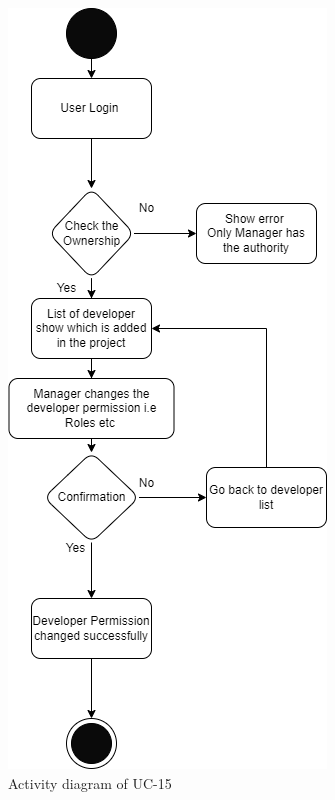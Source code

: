 \begin{figure}[H]
    \centering
    \includegraphics[scale=0.5]{./diagrams/Activity Diagram/ad-15.png}
    \caption{Activity diagram of UC-15}
    \label{fig:act-15}

\end{figure}


